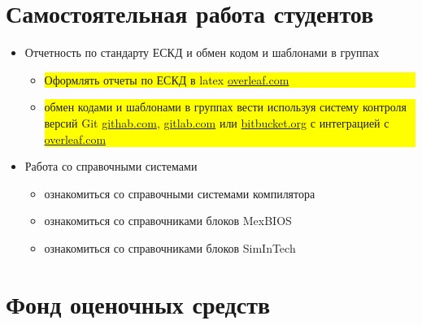 \newpage
\section{Самостоятельная работа студентов}
\begin{itemize}
\item Отчетность по стандарту ЕСКД и обмен кодом и шаблонами в группах
        \begin{itemize}
         \item \colorbox{yellow}{\parbox[t]{0.8\textwidth}{Оформлять отчеты по ЕСКД в latex \url{overleaf.com}}}
         \item \colorbox{yellow}{\parbox[t]{\textwidth}{обмен кодами и шаблонами в группах вести используя систему контроля версий Git 
                    \url{githab.com}, \url{gitlab.com} или \url{bitbucket.org} с интеграцией с \url{overleaf.com}}}
        \end{itemize}

\item Работа со справочными системами
      \begin{itemize}
         \item ознакомиться со справочными системами компилятора
         \item ознакомиться со справочниками блоков MexBIOS
         \item ознакомиться со справочниками блоков SimInTech
      \end{itemize}

\end{itemize}

\newpage

\section{Фонд оценочных средств}

